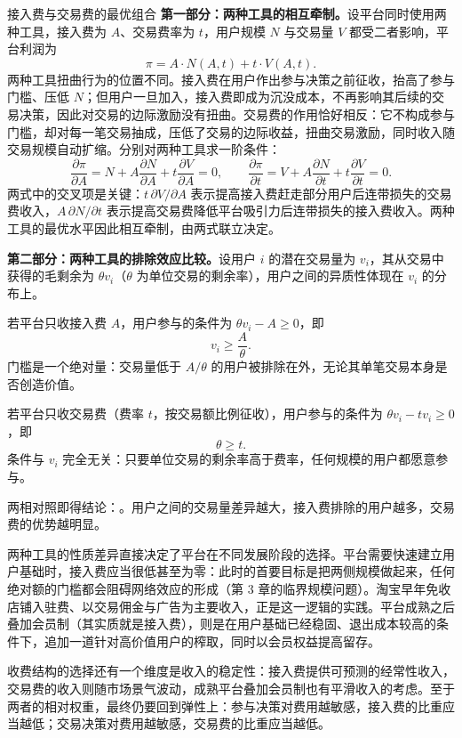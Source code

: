\begin{derivation}{接入费与交易费的最优组合}{}
\textbf{第一部分：两种工具的相互牵制。}设平台同时使用两种工具，接入费为 $A$、交易费率为 $t$，用户规模 $N$ 与交易量 $V$ 都受二者影响，平台利润为
\[
\pi = A \cdot N(A, t) + t \cdot V(A, t).
\]
两种工具扭曲行为的位置不同。接入费在用户作出参与决策之前征收，抬高了参与门槛、压低 $N$；但用户一旦加入，接入费即成为沉没成本，不再影响其后续的交易决策，因此对交易的边际激励没有扭曲。交易费的作用恰好相反：它不构成参与门槛，却对每一笔交易抽成，压低了交易的边际收益，扭曲交易激励，同时收入随交易规模自动扩缩。分别对两种工具求一阶条件：
\[
\frac{\partial \pi}{\partial A} = N + A\frac{\partial N}{\partial A} + t\frac{\partial V}{\partial A} = 0, \qquad
\frac{\partial \pi}{\partial t} = V + A\frac{\partial N}{\partial t} + t\frac{\partial V}{\partial t} = 0.
\]
两式中的交叉项是关键：$t\,\partial V/\partial A$ 表示提高接入费赶走部分用户后连带损失的交易费收入，$A\,\partial N/\partial t$ 表示提高交易费降低平台吸引力后连带损失的接入费收入。两种工具的最优水平因此相互牵制，由两式联立决定。

\textbf{第二部分：两种工具的排除效应比较。}设用户 $i$ 的潜在交易量为 $v_i$，其从交易中获得的毛剩余为 $\theta v_i$（$\theta$ 为单位交易的剩余率），用户之间的异质性体现在 $v_i$ 的分布上。

若平台只收接入费 $A$，用户参与的条件为 $\theta v_i - A \geq 0$，即
\[
v_i \geq \frac{A}{\theta}.
\]
门槛是一个绝对量：交易量低于 $A/\theta$ 的用户被排除在外，无论其单笔交易本身是否创造价值。

若平台只收交易费（费率 $t$，按交易额比例征收），用户参与的条件为 $\theta v_i - t v_i \geq 0$，即
\[
\theta \geq t.
\]
条件与 $v_i$ 完全无关：只要单位交易的剩余率高于费率，任何规模的用户都愿意参与。

两相对照即得结论：。用户之间的交易量差异越大，接入费排除的用户越多，交易费的优势越明显。
\end{derivation}

两种工具的性质差异直接决定了平台在不同发展阶段的选择。平台需要快速建立用户基础时，接入费应当很低甚至为零：此时的首要目标是把两侧规模做起来，任何绝对额的门槛都会阻碍网络效应的形成（第 3 章的临界规模问题）。淘宝早年免收店铺入驻费、以交易佣金与广告为主要收入，正是这一逻辑的实践。平台成熟之后叠加会员制（其实质就是接入费），则是在用户基础已经稳固、退出成本较高的条件下，追加一道针对高价值用户的榨取，同时以会员权益提高留存。

收费结构的选择还有一个维度是收入的稳定性：接入费提供可预测的经常性收入，交易费的收入则随市场景气波动，成熟平台叠加会员制也有平滑收入的考虑。至于两者的相对权重，最终仍要回到弹性上：参与决策对费用越敏感，接入费的比重应当越低；交易决策对费用越敏感，交易费的比重应当越低。

